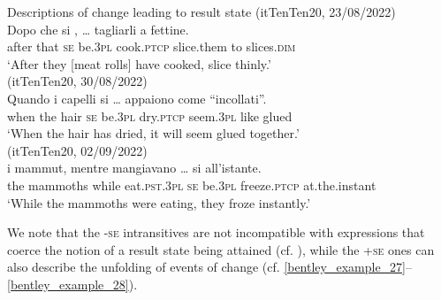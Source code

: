 \documentclass[output=paper,colorlinks,citecolor=brown
]{langscibook}
\begin{document}
\ea \label{bentley_example_25}
    Descriptions of change leading to result state 
    \ea  \label{bentley_example_25a} (itTenTen20, 23/08/2022)\\
    \gll Dopo che	si 		 		,  {\ldots}  tagliarli			a fettine. \\
   				after		that	\textsc{se}		be.3\textsc{pl}	cook.\textsc{ptcp}	{} slice.them	to	slices.\textsc{dim} \\
    \glt ‘After they [meat rolls] have cooked, slice thinly.’ \\
    \ex \label{bentley_example_25b} (itTenTen20, 30/08/2022)\\
    \gll Quando		i		capelli	si		 		  {\ldots}  appaiono		come “incollati”. \\
    when			the	hair			\textsc{se}		be.3\textsc{pl}	dry.\textsc{ptcp}	{}					seem.3\textsc{pl}		like			glued \\
    \glt 					‘When the hair has dried, it will seem glued together.’ \\
    \ex \label{bentley_example_25c}(itTenTen20, 02/09/2022)\\
    \gll  {\ldots}  i			mammut,		mentre		mangiavano  {\ldots}  si 		 		 		all’istante.  \\
    {} 									the	mammoths	while			eat.\textsc{pst}.3\textsc{pl}			{}			\textsc{se}		be.3\textsc{pl}	freeze.\textsc{ptcp}	 at.the.instant \\
    \glt 									‘While the mammoths	 were eating, they froze instantly.’ \\
    \z
\z

We note that the -\textsc{se} intransitives are not incompatible with expressions that coerce the notion of a result state being attained (cf. ), while the +\textsc{se} ones can also describe the unfolding of events of change (cf. \ref{bentley_example_27}--\ref{bentley_example_28}).
\end{document}

